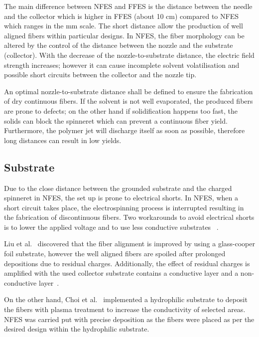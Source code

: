 \documentclass[5p,,preprint,12pt,twocolumn]{elsarticle}
\begin{document}
The main difference between NFES and FFES is the distance between the needle and the collector which is higher in FFES (about 10 cm) compared to NFES which ranges in the mm scale. The short distance allow the production of well aligned fibers within particular designs. In NFES, the fiber morphology can be altered by the control of the distance between the nozzle and the substrate (collector). With the decrease of the nozzle-to-substrate distance, the electric field strength increases; however it can cause incomplete solvent volatilisation and possible short circuits between the collector and the nozzle tip.

An optimal nozzle-to-substrate distance shall be defined to ensure the fabrication of dry continuous fibers. If the solvent is not well evaporated, the produced fibers are prone to defects; on the other hand if solidification happens too fast, the solids can block the spinneret which can prevent a continuous fiber yield. Furthermore, the polymer jet will discharge itself as soon as possible, therefore long distances can result in low yields.



\subsection{Substrate}Due to the close distance between the grounded substrate and the charged spinneret in NFES, the set up is prone to electrical shorts. In NFES, when a short circuit takes place, the electrospinning process is interrupted resulting in the fabrication of discontinuous fibers. Two workarounds to avoid electrical shorts is to lower the applied voltage and to use less conductive substrates \unskip~\cite{527120:11974315,527120:12322289}.

Liu et al.\unskip~\cite{527120:11974315} discovered that the fiber alignment is improved by using a glass-cooper foil substrate, however the well aligned fibers are spoiled after prolonged depositions due to residual charges. Additionally, the effect of residual charges is amplified with the used collector substrate contains a conductive layer and a non-conductive layer\unskip~\cite{527120:11974315}.

On the other hand, Choi et al.\unskip~\cite{527120:12322289} implemented a hydrophilic substrate to deposit the fibers with plasma treatment to increase the conductivity of selected areas. NFES was carried put with precise deposition as the fibers were placed as per the desired design within the hydrophilic substrate.
    
\end{document}
